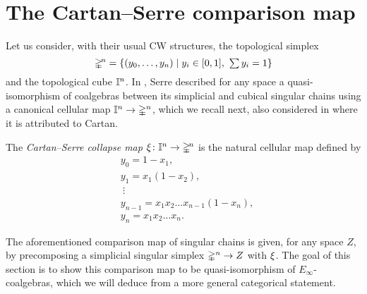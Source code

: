 
\section{The Cartan--Serre comparison map} \label{s:the cartan-serre comparison map}

Let us consider, with their usual CW structures, the topological simplex
\[
\mathbb{\Delta}^{\!n} = \{(y_0, \dots, y_n) \mid y_i \in [0,1], \ \textstyle{\sum} \, y_i = 1\}
\]
and the topological cube $\mathbb{I}^n$.
In \cite[p. 442]{serre1951homologie}, Serre described for any space a quasi-isomorphism of coalgebras between its simplicial and cubical singular chains using a canonical cellular map $\mathbb{I}^n \to \mathbb{\Delta}^n$, which we recall next, also considered in \cite[p.199]{eilenberg1953acyclic} where it is attributed to Cartan.

\begin{definition}
	The \textit{Cartan--Serre collapse map} $\operatorname{\xi} \colon \mathbb{I}^n \to \mathbb{\Delta}^{\!n}$ is the natural cellular map defined by
	\begin{equation} \label{e:cartan-serre collapse map}
	\begin{split}
	&y_0 = 1 - x_1, \\
	&y_1 = x_1(1 - x_2), \\
	&\ \vdots \\
	&y_{n-1} = x_1 x_2 \dots x_{n-1}(1-x_n), \\
	&y_{n} = x_1 x_2 \dots x_n.
	\end{split}
	\end{equation}
\end{definition}

The aforementioned comparison map of singular chains is given, for any space $Z$, by precomposing a simplicial singular simplex $\mathbb{\Delta}^n \to Z$ with $\operatorname{\xi}$.
The goal of this section is to show this comparison map to be quasi-isomorphism of $E_\infty$-coalgebras, which we will deduce from a more general categorical statement.


